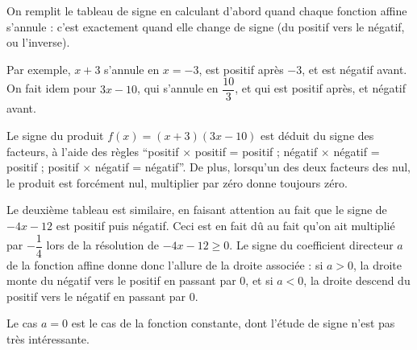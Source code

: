 {\begin{center}
	
	
%	       		
	\end{center}


	On remplit le tableau de signe en calculant d'abord quand chaque fonction affine s'annule : c'est exactement quand elle change de signe (du positif vers le négatif, ou l'inverse).
	
	Par exemple, $x+3$ s'annule en $x=-3$, est positif après $-3$, et est négatif avant.
	On fait idem pour $3x-10$, qui s'annule en $\dfrac{10}3$, et qui est positif après, et négatif avant.
	
	Le signe du produit $f(x) = (x+3)(3x-10)$ est déduit du signe des facteurs, à l'aide des règles ``positif $\times$ positif = positif ; négatif $\times$ négatif = positif ; positif $\times$ négatif = négatif''.
	De plus, lorsqu'un des deux facteurs des nul, le produit est forcément nul, multiplier par zéro donne toujours zéro.
	
	Le deuxième tableau est similaire, en faisant attention au fait que le signe de $-4x-12$ est positif puis négatif.
	Ceci est en fait dû au fait qu'on ait multiplié par $-\dfrac14$ lors de la résolution de $-4x-12 \geq 0$.
	Le signe du coefficient directeur $a$ de la fonction affine donne donc l'allure de la droite associée : si $a>0$, la droite monte du négatif vers le positif en passant par $0$, et si $a <0$, la droite descend du positif vers le négatif en passant par $0$.
	
	Le cas $a=0$ est le cas de la fonction constante, dont l'étude de signe n'est pas très intéressante.
}








